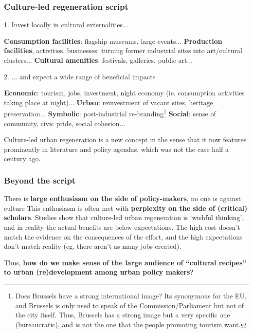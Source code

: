 \documentclass{article}
\begin{document}
\subsubsection{Culture-led regeneration script}

1. Invest locally in cultural externalities...

\begin{outline}
	\1 \textbf{Consumption facilities}: flagship museums, large events...
	\1 \textbf{Production facilities}, activities, businesses: turning former industrial sites into art/cultural clusters...
	\1 \textbf{Cultural amenities}: festivals, galleries, public art...
\end{outline}

2. ... and expect a wide range of beneficial impacts

\begin{outline}
	\1 \textbf{Economic}: tourism, jobs, investment, night economy (ie. consumption activities taking place at night)...
	\1 \textbf{Urban}: reinvestment of vacant sites, heritage preservation...
	\1 \textbf{Symbolic}: post-industrial re-branding\footnote{Does Brussels have a strong international image? Its synonymous for the EU, and Brussels is only used to speak of the Commission/Parliament but not of the city itself. Thus, Brussels has a strong image but a very specific one (bureaucratic), and is not the one that the people promoting tourism want.}
	\1 \textbf{Social}: sense of community, civic pride, social cohesion...
\end{outline}

Culture-led urban regeneration is a new concept in the sense that it now features prominently in literature and policy agendas, which was not the case half a century ago. 

\subsubsection{Beyond the script}

There is \textbf{large enthusiasm on the side of policy-makers}, no one is against culture
This enthusiasm is often met with \textbf{perplexity on the side of (critical) scholars}. Studies show that culture-led urban regeneration is `wishful thinking', and in reality the actual benefits are below expectations. The high cost doesn't match the evidence on the consequences of the effort, and the high expectations don't match reality (eg. there aren't as many jobs created).

Thus, \textbf{how do we make sense of the large audience of ``cultural recipes'' to urban (re)development among urban policy makers?}
\end{document}
